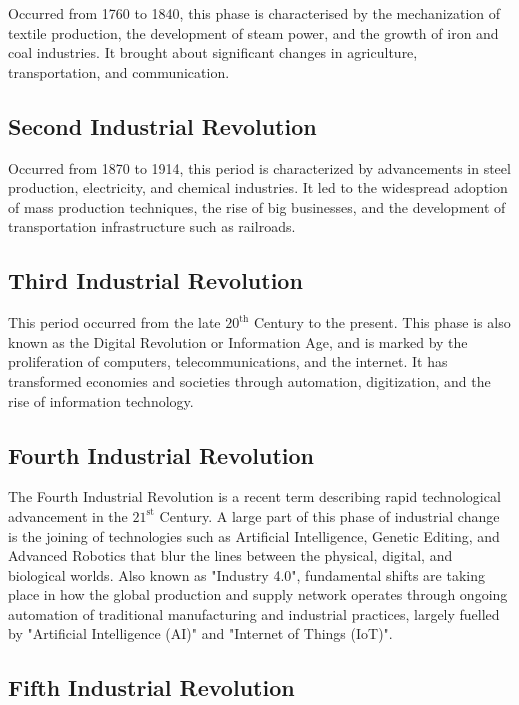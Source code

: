 \documentclass[12pt]{article}
\begin{document}
Occurred from 1760 to 1840, this phase is characterised by the mechanization of textile production, the development of steam power, and the growth of iron and coal industries. It brought about significant changes in agriculture, transportation, and communication.


\subsection*{Second Industrial Revolution}

Occurred from 1870 to 1914, this period is characterized by advancements in steel production, electricity, and chemical industries. It led to the widespread adoption of mass production techniques, the rise of big businesses, and the development of transportation infrastructure such as railroads.


\subsection*{Third Industrial Revolution}

This period occurred from the late $20^{\text{th}}$ Century to the present. This phase is also known as the Digital Revolution or Information Age, and is marked by the proliferation of computers, telecommunications, and the internet. It has transformed economies and societies through automation, digitization, and the rise of information technology.

\subsection*{Fourth Industrial Revolution}

The Fourth Industrial Revolution is a recent term describing rapid technological advancement in the $21^{\text{st}}$ Century. A large part of this phase of industrial change is the joining of technologies such as Artificial Intelligence, Genetic Editing, and Advanced Robotics that blur the lines between the physical, digital, and biological worlds. Also known as "Industry 4.0", fundamental shifts are taking place in how the global production and supply network operates through ongoing automation of traditional manufacturing and industrial practices, largely fuelled by "Artificial Intelligence (AI)" and "Internet of Things (IoT)". 


\subsection*{Fifth Industrial Revolution}
\end{document}
